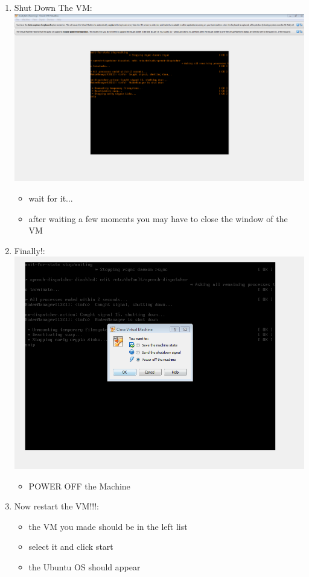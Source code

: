 \documentclass[12pt]{article}
\begin{document}
\begin{description}
\begin{enumerate}
	\newpage
\item Shut Down The VM: \vspace{20mm} \\
      		\includegraphics[scale=.6]{Capture15.png}
			\begin{itemize}
                 
				 \item wait for it...
                 \item after waiting a few moments you may have to close the window of the VM
                     
            \end{itemize}
	\newpage
\item Finally!: \vspace{20mm} \\
      		\includegraphics[scale=.6]{Capture16.png}
            \begin{itemize}
        \item POWER OFF the Machine
    \end{itemize} 
	\newpage
\item Now restart the VM!!!:
    \begin{itemize}
        \item the VM you made should be in the left list
        \item select it and click start
		\item the Ubuntu OS should appear	
    \end{itemize}        

\end{enumerate}    
\end{description}
\end{document}
